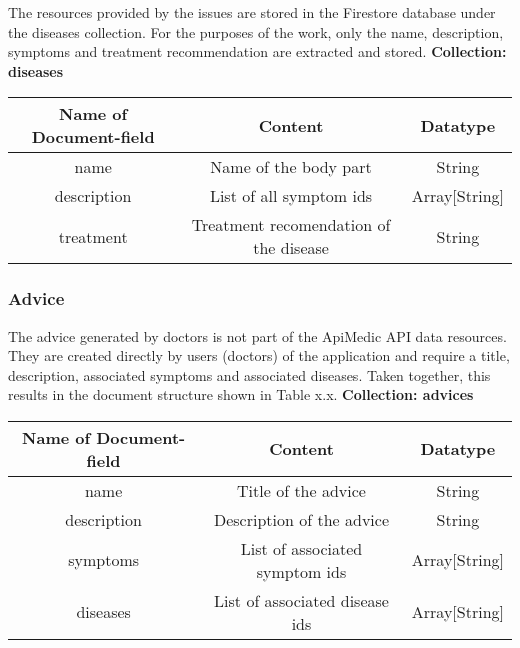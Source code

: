 The resources provided by the issues are stored in the Firestore database under the diseases collection. For the purposes of the work, only the name, description, symptoms and treatment recommendation are extracted and stored.
\newline
\textbf{Collection: diseases}
		\begin{center}
			\begin{tabular}{ | c| c| c | } 
  				\hline
  				Name of Document-field& Content & Datatype \\ 
  				\hline
  				name & Name of the body part & String \\ 
  				\hline
 				description & List of all symptom ids & Array[String] \\ 
  				\hline
  				treatment & Treatment recomendation of the disease & String \\ 
  				\hline
			\end{tabular}
		\end{center}
\subsubsection{Advice}
The advice generated by doctors is not part of the ApiMedic API data resources. They are created directly by users (doctors) of the application and require a title, description, associated symptoms and associated diseases. Taken together, this results in the document structure shown in Table x.x.
\textbf{Collection: advices}
		\begin{center}
			\begin{tabular}{ | c| c| c | } 
  				\hline
  				Name of Document-field& Content & Datatype \\ 
  				\hline
  				name & Title of the advice& String \\ 
  				\hline
 				description & Description of the advice & String \\ 
  				\hline
  				symptoms & List of associated symptom ids & Array[String]\\ 
  				\hline
  				diseases & List of associated disease ids & Array[String]\\ 
  				\hline
			\end{tabular}
		\end{center}
